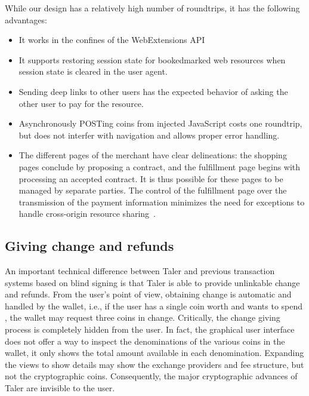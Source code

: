 \documentclass{llncs}
\begin{document}
While our design has a relatively high number of roundtrips,
it has the following advantages:
\begin{itemize}
  \item It works in the confines of the WebExtensions API
  \item It supports restoring session state for bookedmarked
    web resources when session state is cleared in the user agent.
  \item Sending deep links to other users has the expected behavior
    of asking the other user to pay for the resource.
  \item Asynchronously POSTing coins from injected JavaScript costs
    one roundtrip, but does not interfer with navigation and allows
    proper error handling.
  \item The different pages of the merchant have clear
    delineations: the shopping pages conclude by proposing a contract, and
    the fulfillment page begins with processing an accepted contract.  It is thus
    possible for these pages to be managed by separate parties. The
    control of the fulfillment page over the transmission of the payment
    information minimizes the need for exceptions to handle cross-origin
    resource sharing~\cite{rfc6454,cors}.
\end{itemize}


\subsection{Giving change and refunds} %

An important technical difference between Taler and previous
transaction systems based on blind signing is that Taler is able to
provide unlinkable change and refunds.  From the user's point of view,
obtaining change is automatic and handled by the wallet, i.e., if the
user has a single coin worth  and wants to spend , the
wallet may request three  coins in change. Critically, the
change giving process is completely hidden from the user.
In fact, the graphical user
interface does not offer a way to inspect the denominations of the
various coins in the wallet, it only shows the total amount available
in each denomination.  Expanding the views to show details may show
the exchange providers and fee structure, but not the cryptographic
coins.  Consequently, the major cryptographic advances of Taler are
invisible to the user.
\end{document}
